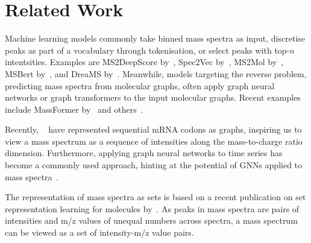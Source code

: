 \section{Related Work}
Machine learning models commonly take binned mass spectra as input, discretise peaks as part of a vocabulary through tokenisation, or select peaks with top-$n$ intentsities. Examples are MS2DeepScore by~\citet{huberMS2DeepScoreNovelDeep2021}, Spec2Vec by~\citet{huberSpec2VecImprovedMass2021}, MS2Mol by~\citet{butlerMS2MolTransformerModel2023}, MSBert by~\citet{zhangMSBERTEmbeddingTandem2024}, and DreaMS by~\citet{bushuievEmergenceMolecularStructures2025}. Meanwhile, models targeting the reverse problem, predicting mass spectra from molecular graphs, often apply graph neural networks or graph transformers to the input molecular graphs. Recent examples include MassFormer by~\citet{youngTandemMassSpectrum2024} and others~\citep{zhangPredictionElectronIonization2022,murphyEfficientlyPredictingHigh2023,parkMassSpectraPrediction2024}. 

Recently, ~\citet{nallapareddyImprovingFulllengthRibosome2024} have represented sequential mRNA codons as graphs, inspiring us to view a mass spectrum as a sequence of intensities along the mass-to-charge ratio dimension. Furthermore, applying graph neural networks to time series has become a commonly used approach, hinting at the potential of GNNs applied to mass spectra~\citep{jinSurveyGraphNeural2024}.

The representation of mass spectra as sets is based on a recent publication on set representation learning for molecules by~\citet{boulougouriMolecularSetRepresentation2024}. As peaks in mass spectra are pairs of intensities and m/z values of unequal numbers across spectra, a mass spectrum can be viewed as a set of intensity-m/z value pairs.
